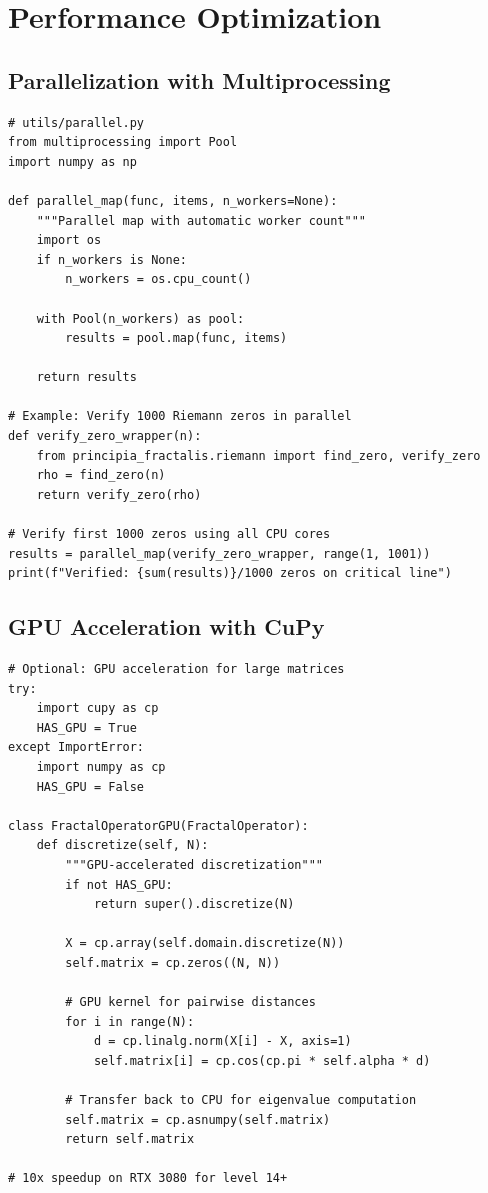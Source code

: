 \section{Performance Optimization}
\label{sec:optimization}

\subsection{Parallelization with Multiprocessing}

\begin{verbatim}
# utils/parallel.py
from multiprocessing import Pool
import numpy as np

def parallel_map(func, items, n_workers=None):
    """Parallel map with automatic worker count"""
    import os
    if n_workers is None:
        n_workers = os.cpu_count()

    with Pool(n_workers) as pool:
        results = pool.map(func, items)

    return results

# Example: Verify 1000 Riemann zeros in parallel
def verify_zero_wrapper(n):
    from principia_fractalis.riemann import find_zero, verify_zero
    rho = find_zero(n)
    return verify_zero(rho)

# Verify first 1000 zeros using all CPU cores
results = parallel_map(verify_zero_wrapper, range(1, 1001))
print(f"Verified: {sum(results)}/1000 zeros on critical line")
\end{verbatim}

\subsection{GPU Acceleration with CuPy}

\begin{verbatim}
# Optional: GPU acceleration for large matrices
try:
    import cupy as cp
    HAS_GPU = True
except ImportError:
    import numpy as cp
    HAS_GPU = False

class FractalOperatorGPU(FractalOperator):
    def discretize(self, N):
        """GPU-accelerated discretization"""
        if not HAS_GPU:
            return super().discretize(N)

        X = cp.array(self.domain.discretize(N))
        self.matrix = cp.zeros((N, N))

        # GPU kernel for pairwise distances
        for i in range(N):
            d = cp.linalg.norm(X[i] - X, axis=1)
            self.matrix[i] = cp.cos(cp.pi * self.alpha * d)

        # Transfer back to CPU for eigenvalue computation
        self.matrix = cp.asnumpy(self.matrix)
        return self.matrix

# 10x speedup on RTX 3080 for level 14+
\end{verbatim}

